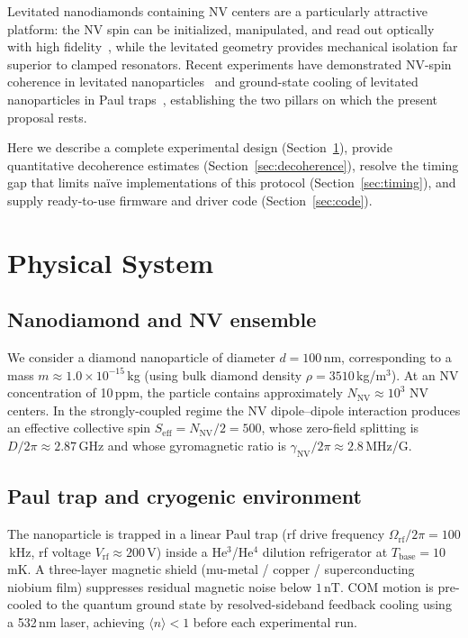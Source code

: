 \documentclass[12pt,a4paper]{article}
\begin{document}
Levitated nanodiamonds containing NV centers are a particularly attractive
platform: the NV spin can be initialized, manipulated, and read out optically
with high fidelity~\cite{Doherty2013}, while the levitated geometry provides
mechanical isolation far superior to clamped resonators. Recent experiments have
demonstrated NV-spin coherence in levitated nanoparticles~\cite{Delord2021} and
ground-state cooling of levitated nanoparticles in Paul traps~\cite{Conangla2020},
establishing the two pillars on which the present proposal rests.

Here we describe a complete experimental design (Section~\ref{sec:system}),
provide quantitative decoherence estimates (Section~\ref{sec:decoherence}),
resolve the timing gap that limits na\"ive implementations of this protocol
(Section~\ref{sec:timing}), and supply ready-to-use firmware and driver code
(Section~\ref{sec:code}).

\section{Physical System}
\label{sec:system}

\subsection{Nanodiamond and NV ensemble}

We consider a diamond nanoparticle of diameter $d = 100$\,nm, corresponding to
a mass $m \approx 1.0\times10^{-15}$\,kg (using bulk diamond density
$\rho = 3510$\,kg/m$^3$). At an NV concentration of 10\,ppm, the particle
contains approximately $N_{\mathrm{NV}} \approx 10^3$ NV centers. In the
strongly-coupled regime the NV dipole--dipole interaction produces an effective
collective spin $S_{\mathrm{eff}} = N_{\mathrm{NV}}/2 = 500$, whose zero-field
splitting is $D/2\pi \approx 2.87$\,GHz and whose gyromagnetic ratio is
$\gamma_{\mathrm{NV}}/2\pi \approx 2.8$\,MHz/G.

\subsection{Paul trap and cryogenic environment}

The nanoparticle is trapped in a linear Paul trap (rf drive frequency
$\Omega_{\mathrm{rf}}/2\pi = 100$\,kHz, rf voltage $V_{\mathrm{rf}} \approx 200$\,V)
inside a He$^3$/He$^4$ dilution refrigerator at $T_{\mathrm{base}} = 10$\,mK.
A three-layer magnetic shield (mu-metal / copper / superconducting niobium film)
suppresses residual magnetic noise below $1$\,nT. COM motion is pre-cooled to
the quantum ground state by resolved-sideband feedback cooling using a 532\,nm
laser, achieving $\langle n \rangle < 1$ before each experimental run.
\end{document}
